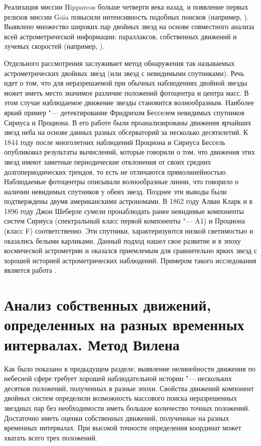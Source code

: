 Реализация миссии Hipparcos больше четверти века назад, и появление первых релизов миссии Gaia повысили интенсивность подобных поисков (например, \cite{2018JDSO...14..367K}). Выявлено множество широких пар двойных звезд на основе совместного анализа всей астрометрической информации: параллаксов, собственных движений и лучевых скоростей (например, \cite{2019A&A...623A..72K}).

Отдельного рассмотрения заслуживает метод обнаружения так называемых астрометрических двойных звезд (или звезд с невидимыми спутниками). Речь идет о том, что для неразрешаемой при обычных наблюдениях двойной звезды может иметь место значимое различие положений фотоцентра и центра масс. В этом случае наблюдаемое движение звезды становится волнообразным. Наиболее яркий пример "--- детектирование Фридрихом Бесселем невидимых спутников Сириуса и Проциона. В его работе были проанализированы движения ярчайших звезд неба на основе данных разных обсерваторий за несколько десятилетий. К 1844 году после многолетних наблюдений Проциона и Сириуса Бессель опубликовал результаты вычислений, которые говорили о том, что движения этих звезд имеют заметные периодические отклонения от своих средних долгопериодических трендов, то есть не отличаются прямолинейностью. Наблюдаемые фотоцентры описывали волнообразные линии, что говорило о наличии невидимых спутников у обеих звезд. Позднее эти выводы были подтверждены двумя американскими астрономами. В 1862 году Алван Кларк и в 1896 году Джон Шеберле сумели пронаблюдать ранее невидимые компоненты систем Сириуса (спектральный класс первой компоненты "--- A1) и Проциона (класс F) соответственно. Эти спутники, характеризуются низкой светимостью и оказались белыми карликами. Данный подход нашел свое развитие и в эпоху космической астрометрии и оказался приемлемым для сравнительно ярких звезд с хорошей историей астрометрических наблюдений. Примером такого исследования является работа \cite{2002A&A...391..647G}.

\section{Анализ собственных движений, определенных на разных временных интервалах. Метод Вилена} \label{sec:ch1/sec2}
Как было показано в предыдущем разделе, выявление нелинейности движения по небесной сфере требует хорошей наблюдательной истории "--- нескольких десятков положений, полученных в разные эпохи. Свойства движений компонент двойных систем определили возможность массового поиска неразрешенных звездных пар без необходимости иметь большое количество точных положений. Достаточно иметь оценки собственных движений, полученные на разных временных интервалах. При высокой точности определения координат может хватать всего трех положений.

